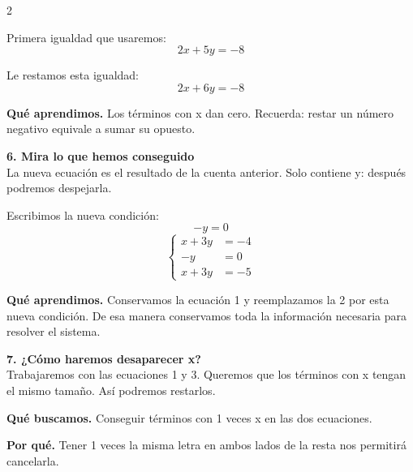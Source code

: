 \documentclass[11pt,a4paper,landscape]{article}
\begin{document}
\begin{multicols*}{2}
\begin{minipage}{\linewidth}
\par\smallskip Primera igualdad que usaremos:
\[2x + 5y = -8\]
\par\smallskip Le restamos esta igualdad:
\[2x + 6y = -8\]
\par\smallskip\textbf{Qué aprendimos.} Los términos con x dan cero. Recuerda: restar un número negativo equivale a sumar su opuesto.
\end{minipage}\par\medskip
\noindent\begin{minipage}{\linewidth}\textbf{6. Mira lo que hemos conseguido}\\[2pt]La nueva ecuación es el resultado de la cuenta anterior. Solo contiene y: después podremos despejarla.
\par\smallskip Escribimos la nueva condición:
\[-y = 0\]
\[\left\{\begin{aligned}x + 3y &= -4\\-y &= 0\\x + 3y &= -5\end{aligned}\right.\]
\par\smallskip\textbf{Qué aprendimos.} Conservamos la ecuación 1 y reemplazamos la 2 por esta nueva condición. De esa manera conservamos toda la información necesaria para resolver el sistema.
\end{minipage}\par\medskip
\noindent\begin{minipage}{\linewidth}\textbf{7. ¿Cómo haremos desaparecer x?}\\[2pt]Trabajaremos con las ecuaciones 1 y 3. Queremos que los términos con x tengan el mismo tamaño. Así podremos restarlos.
\par\smallskip\textbf{Qué buscamos.} Conseguir términos con 1 veces x en las dos ecuaciones.
\par\smallskip\textbf{Por qué.} Tener 1 veces la misma letra en ambos lados de la resta nos permitirá cancelarla.
\par{}\par\smallskip

\end{minipage}
\end{multicols*}
\end{document}
